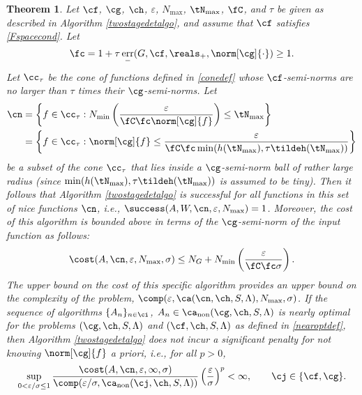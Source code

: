 \documentclass[final]{elsarticle}
\DeclareMathOperator{\err}{err}
\newtheorem{theorem}{Theorem}
\theoremstyle{definition}
\theoremstyle{remark}
\DeclareMathOperator{\fix}{non}
\begin{document}
\begin{theorem}  \label{TwoStageDetermThm}  Let  $\cf$, $\cg$, $\ch$, $\varepsilon$, $N_{\max}$, $\tN_{\max}$, $\fC$, and $\tau$ be given as described in Algorithm \ref{twostagedetalgo}, and assume that $\cf$ satisfies \eqref{Fspacecond}.  Let 
\begin{equation} \label{normdeflate}
\fc =1 + \tau \err_{-}(G,\cf,\reals_+,\norm[\cg]{\cdot})  \ge 1.
\end{equation}
Let $\cc_\tau$ be the cone of functions defined in \eqref{conedef} whose $\cf$-semi-norms are no larger than $\tau$ times their $\cg$-semi-norms.  Let
\begin{align} 
\nonumber
\cn &= \left \{ f \in \cc_\tau : N_{\min}\left(\frac{\varepsilon}{\fC \fc \norm[\cg]{f}} \right) \le \tN_{\max} \right\} \\
\label{nicefdef}
&= \left \{ f \in \cc_\tau : \norm[\cg]{f} \le \frac{\varepsilon}{\fC \fc \min(h(\tN_{\max}),\tau \tildeh(\tN_{\max}))} \right\}
\end{align}
be a subset of the cone $\cc_\tau$ that lies inside a $\cg$-semi-norm ball of rather large radius (since $\min(h(\tN_{\max}),\tau \tildeh(\tN_{\max}))$ is assumed to be tiny).  Then it follows that Algorithm \ref{twostagedetalgo} is successful for all functions in this set of \emph{nice} functions $\cn$,  i.e.,  $\success(A,W,\cn,\varepsilon,N_{\max}) = 1$.  Moreover, the cost of this algorithm is bounded above in terms of the $\cg$-semi-norm of the input function as follows:
\begin{equation} \label{auto2stagedetcost}
\cost(A,\cn,\varepsilon,N_{\max},\sigma)
\le N_G+ N_{\min}\left(\frac{\varepsilon}{\fC \fc \sigma} \right).
\end{equation}
The upper bound on the cost of this specific algorithm provides an upper bound on the complexity of the problem, $\comp(\varepsilon,\ca(\cn,\ch,S,\Lambda),N_{\max},\sigma)$.  If the sequence of algorithms $\{A_n\}_{n \in \ci}$, $A_n \in\ca_{\fix}(\cg,\ch,S,\Lambda)$  is nearly optimal for the problems $(\cg,\ch,S,\Lambda)$ and $(\cf,\ch,S,\Lambda)$ as defined in \eqref{nearoptdef}, then Algorithm \ref{twostagedetalgo} does not incur a significant penalty for not knowing $\norm[\cg]{f}$ a priori, i.e., for all $p>0$,
\begin{equation} \label{penalty}
\sup_{0 < \varepsilon/\sigma \le 1} \frac{\cost(A,\cn,\varepsilon,\infty,\sigma)} {\comp(\varepsilon/\sigma,\ca_{\fix}(\cj,\ch,S,\Lambda))} \left(\frac{\varepsilon}{\sigma}\right)^p <\infty, \qquad \cj \in \{\cf,\cg\}.
\end{equation}
\end{theorem}
\end{document}
